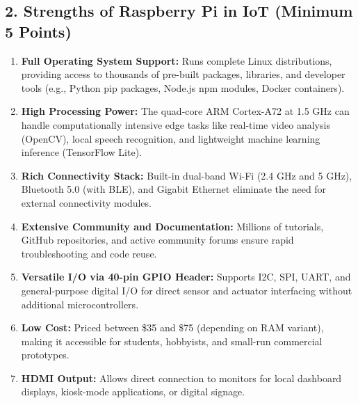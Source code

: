 \subsection{2. Strengths of Raspberry Pi in IoT (Minimum 5 Points)}
\begin{enumerate}
  \item \textbf{Full Operating System Support:} Runs complete Linux distributions, providing access to thousands of pre-built packages, libraries, and developer tools (e.g., Python pip packages, Node.js npm modules, Docker containers).
  \item \textbf{High Processing Power:} The quad-core ARM Cortex-A72 at 1.5 GHz can handle computationally intensive edge tasks like real-time video analysis (OpenCV), local speech recognition, and lightweight machine learning inference (TensorFlow Lite).
  \item \textbf{Rich Connectivity Stack:} Built-in dual-band Wi-Fi (2.4 GHz and 5 GHz), Bluetooth 5.0 (with BLE), and Gigabit Ethernet eliminate the need for external connectivity modules.
  \item \textbf{Extensive Community and Documentation:} Millions of tutorials, GitHub repositories, and active community forums ensure rapid troubleshooting and code reuse.
  \item \textbf{Versatile I/O via 40-pin GPIO Header:} Supports I2C, SPI, UART, and general-purpose digital I/O for direct sensor and actuator interfacing without additional microcontrollers.
  \item \textbf{Low Cost:} Priced between \$35 and \$75 (depending on RAM variant), making it accessible for students, hobbyists, and small-run commercial prototypes.
  \item \textbf{HDMI Output:} Allows direct connection to monitors for local dashboard displays, kiosk-mode applications, or digital signage.
\end{enumerate}


